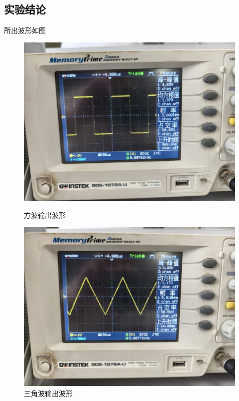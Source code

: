 \documentclass[12pt, a4paper]{article}
\begin{document}
\subsection{实验结论}
所出波形如图
\begin{figure}
    \centering
    \begin{minipage}{0.45\textwidth}
        \centering
        \includegraphics[width=\linewidth]{image/7.jpg}
        \caption{方波输出波形}
        \label{fig:方波输出波形}
    \end{minipage}\hfill
    \begin{minipage}{0.45\textwidth}
        \centering
        \includegraphics[width=\linewidth]{image/8.jpg}
        \caption{三角波输出波形}
        \label{fig:三角波输出波形}

\end{minipage}
\end{figure}
\end{document}
